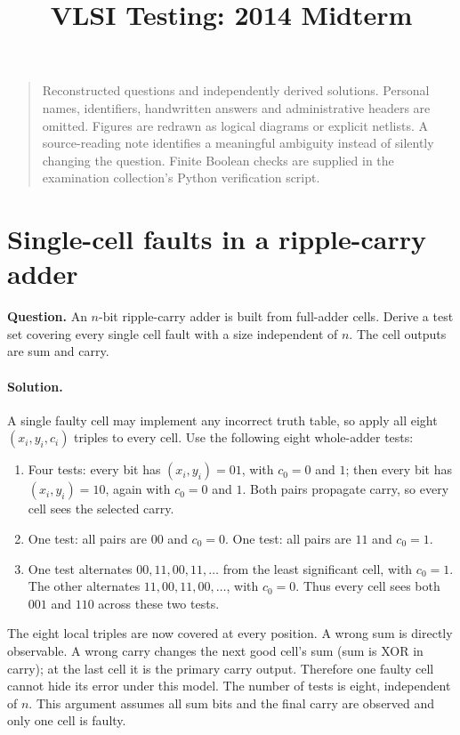 \documentclass[11pt]{article}
\newcommand{\sol}{\paragraph{Solution.}}
\begin{document}
\title{VLSI Testing: 2014 Midterm}\author{}\date{}\maketitle\begin{quote}\small
Reconstructed questions and independently derived solutions. Personal names, identifiers,
handwritten answers and administrative headers are omitted. Figures are redrawn as
logical diagrams or explicit netlists. A source-reading note identifies a meaningful
ambiguity instead of silently changing the question. Finite Boolean checks
are supplied in the examination collection's Python verification script.
\end{quote}

\section{Single-cell faults in a ripple-carry adder}
\textbf{Question.} An $n$-bit ripple-carry adder is built from full-adder cells.
Derive a test set covering every single cell fault with a size independent of $n$.
The cell outputs are sum and carry.
\begin{center}\end{center}

\sol A single faulty cell may implement any incorrect truth table, so apply all
eight $(x_i,y_i,c_i)$ triples to every cell. Use the following eight whole-adder tests:
\begin{enumerate}
\item Four tests: every bit has $(x_i,y_i)=01$, with $c_0=0$ and $1$;
then every bit has $(x_i,y_i)=10$, again with $c_0=0$ and $1$.
Both pairs propagate carry, so every cell sees the selected carry.
\item One test: all pairs are $00$ and $c_0=0$.
One test: all pairs are $11$ and $c_0=1$.
\item One test alternates $00,11,00,11,\ldots$ from the least significant cell,
with $c_0=1$. The other alternates $11,00,11,00,\ldots$, with $c_0=0$.
Thus every cell sees both $001$ and $110$ across these two tests.
\end{enumerate}
The eight local triples are now covered at every position. A wrong sum is directly
observable. A wrong carry changes the next good cell's sum (sum is XOR in carry);
at the last cell it is the primary carry output. Therefore one faulty cell cannot
hide its error under this model. The number of tests is eight, independent of $n$.
This argument assumes all sum bits and the final carry are observed and only one
cell is faulty.
\end{document}
